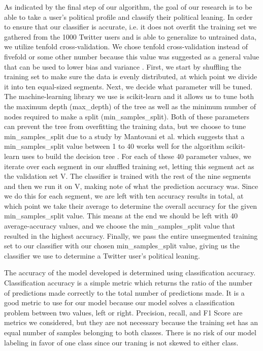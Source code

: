 \documentclass[letterpaper]{article} %
\begin{document}
As indicated by the final step of our algorithm, the goal of our research is to be able to take a user’s political profile and classify their political leaning. In order to ensure that our classifier is accurate, i.e. it does not overfit the training set we gathered from the 1000 Twitter users and is able to generalize to untrained data, we utilize tenfold cross-validation. We chose tenfold cross-validation instead of fivefold or some other number because this value was suggested as a general value that can be used to lower bias and variance \cite{khunApplied}. First, we start by shuffling the training set to make sure the data is evenly distributed, at which point we divide it into ten equal-sized segments. Next, we decide what parameter will be tuned. The machine-learning library we use is scikit-learn and it allows us to tune both the maximum depth (max\_depth) of the tree as well as the minimum number of nodes required to make a split (min\_samples\_split). Both of these parameters can prevent the tree from overfitting the training data, but we choose to tune min\_samples\_split due to a study by Mantovani et al. which suggests that a min\_samples\_split value between 1 to 40 works well for the algorithm scikit-learn uses to build the decision tree \cite{mantovaniAnEmperical}. For each of these 40 parameter values, we iterate over each segment in our shuffled training set, letting this segment act as the validation set V. The classifier is trained with the rest of the nine segments and then we run it on V, making note of what the prediction accuracy was. Since we do this for each segment, we are left with ten accuracy results in total, at which point we take their average to determine the overall accuracy for the given min\_samples\_split value. This means at the end we should be left with 40 average-accuracy values, and we choose the min\_samples\_split value that resulted in the highest accuracy. Finally, we pass the entire unsegmented training set to our classifier with our chosen min\_samples\_split value, giving us the classifier we use to determine a Twitter user’s political leaning.

The accuracy of the model developed is determined using classification accuracy. Classification accuracy is a simple metric which returns the ratio of the number of predictions made correctly to the total number of predictions made. It is a good metric to use for our model because our model solves a classification problem between two values, left or right. Precision, recall, and F1 Score are metrics we considered, but they are not necessary because the training set has an equal number of samples belonging to both classes. There is no risk of our model labeling in favor of one class since our traning is not skewed to either class.


\newpage


\end{document}
